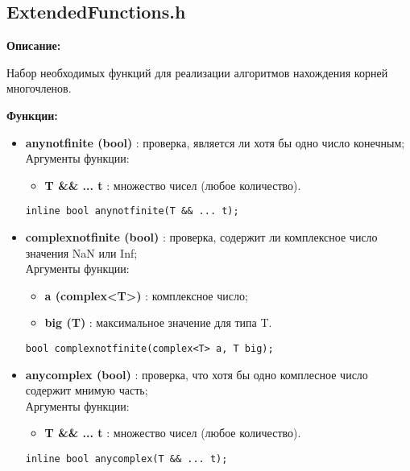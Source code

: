 \documentclass[a4paper,12pt]{article}
\begin{document}
\subsection{ExtendedFunctions.h}
\textbf{Описание:}

Набор необходимых функций для реализации алгоритмов нахождения корней многочленов.

\textbf{Функции:}
\begin{itemize}
    \item \textbf{anynotfinite (bool)} : проверка, является ли хотя бы одно число конечным;
    \\Аргументы функции:
    \begin{itemize}
        \renewcommand{\labelitemi}{-}
        \item \textbf{T \&\& ... t } : множество чисел (любое количество).
    \end{itemize}
    \begin{lstlisting}[language=С++]
inline bool anynotfinite(T && ... t); \end{lstlisting}

    \item \textbf{complexnotfinite (bool)} : проверка, содержит ли комплексное число значения NaN или Inf;
    \\Аргументы функции:
    \begin{itemize}
        \renewcommand{\labelitemi}{-}
        \item \textbf{a (complex<T>)} : комплексное число;
        \item \textbf{big (T)} : максимальное значение для типа T.
    \end{itemize}
    \begin{lstlisting}[language=С++]
bool complexnotfinite(complex<T> a, T big); \end{lstlisting}

    \item \textbf{anycomplex (bool)} : проверка, что хотя бы одно комплесное число содержит мнимую часть;
    \\Аргументы функции:
    \begin{itemize}
        \renewcommand{\labelitemi}{-}
        \item \textbf{T \&\& ... t } : множество чисел (любое количество).
    \end{itemize}
    \begin{lstlisting}[language=С++]
inline bool anycomplex(T && ... t); \end{lstlisting}


\end{itemize}
\end{document}
